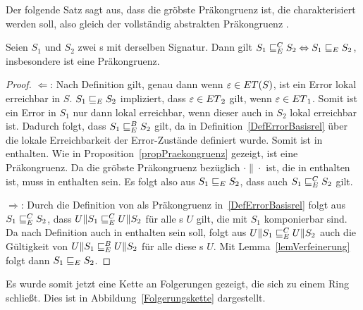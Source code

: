 Der folgende Satz sagt aus, dass \ERel{} die gröbste Präkongruenz ist, die
charakterisiert werden soll, also gleich der vollständig abstrakten
Präkongruenz \ECRel{}.

\begin{satz}
\label{satzFullAbstractness}
  Seien $S_1$ und $S_2$ zwei \EIO{}s mit derselben Signatur. Dann gilt
  $S_1\sqsubseteq _E^C S_2\Leftrightarrow S_1\sqsubseteq _E S_2$, insbesondere ist \ERel{}
  eine Präkongruenz.
\end{satz}

\begin{proof}
  \glqq{}$\Leftarrow$\grqq{}: Nach Definition gilt, genau dann wenn
      $\varepsilon\in ET{}(S)$, ist ein Error lokal erreichbar in $S$.
      $S_1\sqsubseteq _E S_2$ impliziert, dass $\varepsilon\in
      ET{}_2$ gilt, wenn $\varepsilon\in ET{}_1$. Somit ist ein Error
      in $S_1$ nur dann lokal erreichbar, wenn dieser auch in $S_2$ lokal
      erreichbar ist. Dadurch folgt, dass $S_1\sqsubseteq _E^B S_2$ gilt, da \EBRel{} in
      Definition~\ref{DefErrorBasisrel} über die lokale Erreichbarkeit der
      Error-Zustände definiert wurde. Somit ist \ERel{} in \EBRel{} enthalten.
      Wie in Proposition~\ref{propPraekongruenz} gezeigt, ist \ERel{} eine
      Präkongruenz. Da \ECRel{} die gröbste Präkongruenz bezüglich
      $\cdot\|\cdot$ ist, die in \EBRel{} enthalten ist, muss \ERel{} in
      \ECRel{} enthalten sein. Es folgt also aus $S_1\sqsubseteq _E S_2$, dass auch
      $S_1\sqsubseteq _E^C{} S_2$ gilt.

      \glqq{}$\Rightarrow$\grqq{}: Durch die Definition von \ECRel{} als
      Präkongruenz in~\ref{DefErrorBasisrel} folgt aus $S_1\sqsubseteq _E^C S_2$, dass
      $U\|S_1\sqsubseteq _E^C U\|S_2$ für alle \EIO{}s $U$ gilt, die mit $S_1$ komponierbar
      sind. Da \ECRel{} nach Definition auch in \EBRel{} enthalten sein soll,
      folgt aus $U\|S_1\sqsubseteq _E^C U\|S_2$ auch die Gültigkeit von $U\|S_1\sqsubseteq _E^B
      U\|S_2$ für alle diese \EIO{}s $U$. Mit Lemma~\ref{lemVerfeinerung} folgt
      dann $S_1\sqsubseteq _E S_2$.
\end{proof}

Es wurde somit jetzt eine Kette an Folgerungen gezeigt, die sich zu einem
Ring schließt. Dies ist in Abbildung~\ref{Folgerungskette} dargestellt.

